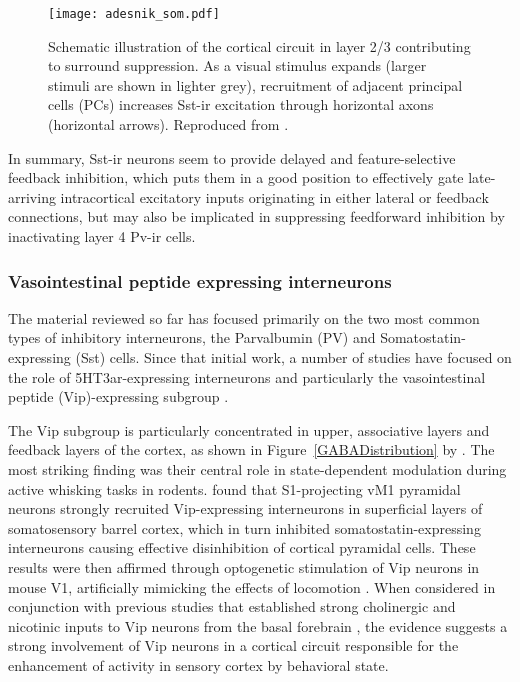 \begin{figure}
	\centering
        \texttt{[image: adesnik\_som.pdf]}
	\caption[Schematic proposing Sst neurons' role in integrating
      long-range inputs. Reproduced from
      \cite{Adesnik2012}.]{Schematic illustration of the cortical
      circuit in layer 2/3 contributing to surround suppression. As a
      visual stimulus expands (larger stimuli are shown in lighter
      grey), recruitment of adjacent principal cells (PCs) increases
      Sst-ir excitation through horizontal axons (horizontal
      arrows). Reproduced from \cite{Adesnik2012}.}
	\label{som}
\end{figure}

In summary, Sst-ir neurons seem to provide delayed and
feature-selective feedback inhibition, which puts them in a good
position to effectively gate late-arriving intracortical excitatory
inputs originating in either lateral or feedback connections, but may
also be implicated in suppressing feedforward inhibition by
inactivating layer 4 Pv-ir cells.

\subsubsection*{Vasointestinal peptide expressing interneurons}

The material reviewed so far has focused primarily on the two most
common types of inhibitory interneurons, the Parvalbumin (PV) and
Somatostatin-expressing (Sst) cells.  Since that initial work, a
number of studies have focused on the role of 5HT3ar-expressing
interneurons and particularly the vasointestinal peptide
(Vip)-expressing subgroup \citep{Lee2013, Fu2014, Higley2014,
  Kepecs2014}.

The Vip subgroup is particularly concentrated in upper, associative
layers and feedback layers of the cortex, as shown in
Figure~\ref{GABADistribution} by \cite{Rudy2011}. The most striking
finding was their central role in state-dependent modulation during
active whisking tasks in rodents. \cite{Lee2013} found that
S1-projecting vM1 pyramidal neurons strongly recruited Vip-expressing
interneurons in superficial layers of somatosensory barrel cortex,
which in turn inhibited somatostatin-expressing interneurons causing
effective disinhibition of cortical pyramidal cells. These results
were then affirmed through optogenetic stimulation of Vip neurons in
mouse V1, artificially mimicking the effects of locomotion
\citep{Fu2014}. When considered in conjunction with previous studies
that established strong cholinergic and nicotinic inputs to Vip
neurons from the basal forebrain \citep{Wickersham2009}, the evidence
suggests a strong involvement of Vip neurons in a cortical circuit
responsible for the enhancement of activity in sensory cortex by
behavioral state.

